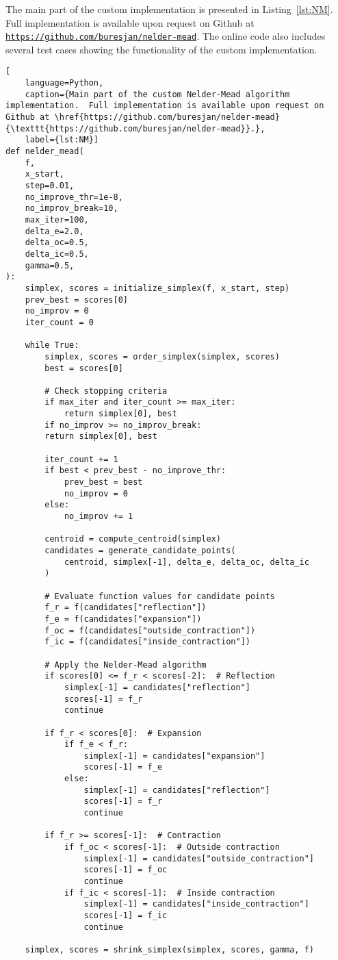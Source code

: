 The main part of the custom implementation is presented in Listing~\ref{lst:NM}. Full implementation is available upon request on Github at \href{https://github.com/buresjan/nelder-mead}{\texttt{https://github.com/buresjan/nelder-mead}}. The online code also includes several test cases showing the functionality of the custom implementation.

\newpage
\begin{lstlisting}[
	language=Python,
	caption={Main part of the custom Nelder-Mead algorithm implementation.  Full implementation is available upon request on Github at \href{https://github.com/buresjan/nelder-mead}{\texttt{https://github.com/buresjan/nelder-mead}}.},
	label={lst:NM}]
def nelder_mead(
	f,
	x_start,
	step=0.01,
	no_improve_thr=1e-8,
	no_improv_break=10,
	max_iter=100,
	delta_e=2.0,
	delta_oc=0.5,
	delta_ic=0.5,
	gamma=0.5,
):
	simplex, scores = initialize_simplex(f, x_start, step)
	prev_best = scores[0]
	no_improv = 0
	iter_count = 0
	
	while True:
		simplex, scores = order_simplex(simplex, scores)
		best = scores[0]
		
		# Check stopping criteria
		if max_iter and iter_count >= max_iter:
			return simplex[0], best
		if no_improv >= no_improv_break:
		return simplex[0], best
		
		iter_count += 1
		if best < prev_best - no_improve_thr:
			prev_best = best
			no_improv = 0
		else:
			no_improv += 1
		
		centroid = compute_centroid(simplex)
		candidates = generate_candidate_points(
			centroid, simplex[-1], delta_e, delta_oc, delta_ic
		)
		
		# Evaluate function values for candidate points
		f_r = f(candidates["reflection"])
		f_e = f(candidates["expansion"])
		f_oc = f(candidates["outside_contraction"])
		f_ic = f(candidates["inside_contraction"])
		
		# Apply the Nelder-Mead algorithm
		if scores[0] <= f_r < scores[-2]:  # Reflection
			simplex[-1] = candidates["reflection"]
			scores[-1] = f_r
			continue
		
		if f_r < scores[0]:  # Expansion
			if f_e < f_r:
				simplex[-1] = candidates["expansion"]
				scores[-1] = f_e
			else:
				simplex[-1] = candidates["reflection"]
				scores[-1] = f_r
				continue
		
		if f_r >= scores[-1]:  # Contraction
			if f_oc < scores[-1]:  # Outside contraction
				simplex[-1] = candidates["outside_contraction"]
				scores[-1] = f_oc
				continue
			if f_ic < scores[-1]:  # Inside contraction
				simplex[-1] = candidates["inside_contraction"]
				scores[-1] = f_ic
				continue
		
	simplex, scores = shrink_simplex(simplex, scores, gamma, f)
\end{lstlisting}